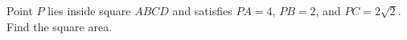 Point $P$ lies inside square $ABCD$ and satisfies $PA=4$, $PB=2$, and $PC=2\sqrt2$. Find the square area.

